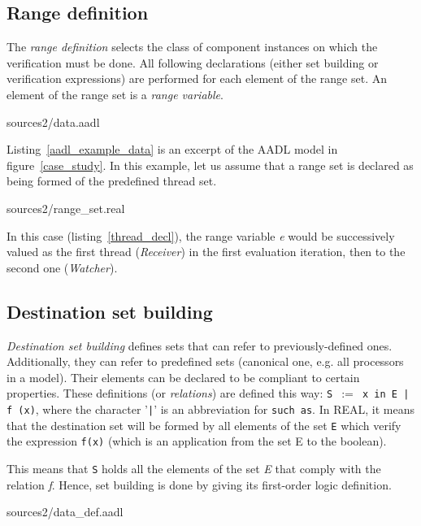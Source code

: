 \documentclass[a4paper,10pt]{article}
\newcommand{\aadl} {\textsc{AADL}}
\newcommand{\real}{\textsc{REAL}}
\begin{document}
\subsection{Range definition}

The \textit{range definition} selects the class of component instances
on which the verification must be done. All following declarations
(either set building or verification expressions) are performed for
each element of the range set. An element of the range set is a
\textit{range variable}.

\lstset{language=aadl}

                {sources2/data.aadl}

Listing~\ref{aadl_example_data} is an excerpt of the \aadl{} model in
figure~\ref{case_study}.  In this example, let us assume that a range
set is declared as being formed of the predefined thread set.

\lstset{language=real}

                {sources2/range_set.real}

In this case (listing~\ref{thread_decl}), the range
variable \textit{e} would be successively valued as
the first thread (\textit{Receiver}) in the first
evaluation iteration, then to the second one
(\textit{Watcher}).

\subsection{Destination set building}
\label{set_building}

\textit{Destination set building} defines sets that can refer to
previously-defined ones. Additionally, they can refer to predefined
sets (canonical one, e.g. all processors in a model). Their elements
can be declared to be compliant to certain properties. These definitions
(or \textit{relations}) are defined this way: \texttt{S
  $:=$ {x in E | f (x)}}, where the character '\texttt{|}' is an 
abbreviation for \texttt{such as}. In \real{}, it means that the 
destination set will be formed by all elements of the set \texttt{E}
which verify the expression \texttt{f(x)} (which is an application 
from the set E to the boolean).

This means that \texttt{S} holds all the elements of the set
\textit{E} that comply with the relation \textit{f}. Hence, set
building is done by giving its first-order logic definition.

\lstset{language=aadl}

                {sources2/data_def.aadl}
\end{document}
